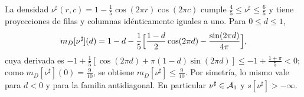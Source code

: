 \begin{observacion}\label{obs:slater}
La densidad $\nu^\sharp(r,c)=1-\frac15\cos(2\pi r)\cos(2\pi c)$ cumple $\frac45\le\nu^\sharp\le\frac65$ y
tiene proyecciones de filas y columnas idénticamente iguales a uno. Para $0\le d\le1$,
\[
 m_D[\nu^\sharp](d)=1-d-\frac15\Bigl[\frac{1-d}2\cos(2\pi d)-\frac{\sin(2\pi d)}{4\pi}\Bigr],
\]
cuya derivada es $-1+\frac15[\cos(2\pi d)+\pi(1-d)\sin(2\pi d)]\le-1+\frac{1+\pi}5<0$; como
$m_D[\nu^\sharp](0)=\frac9{10}$, se obtiene $m_D[\nu^\sharp]\le\frac9{10}$. Por simetría, lo mismo vale para
$d<0$ y para la familia antidiagonal. En particular $\nu^\sharp\in{\mathcal{A}}_1$ y $s[\nu^\sharp]>-\infty$.
\end{observacion}
